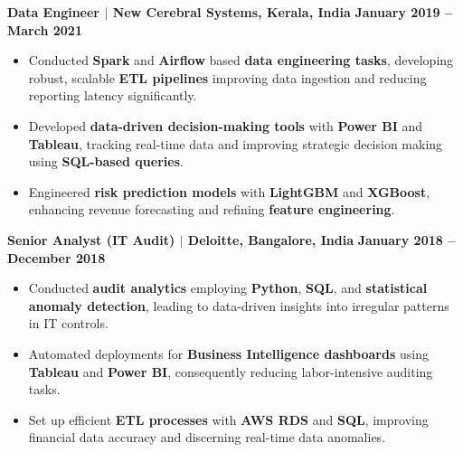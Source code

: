 \documentclass{article}
\begin{document}
\vspace{1mm}
\noindent \textbf{Data Engineer $\mid$ New Cerebral Systems, Kerala, India} \hfill \textbf{January 2019 -- March 2021}
\begin{itemize}[noitemsep, nolistsep, leftmargin=*]
    \item Conducted \textbf{Spark} and \textbf{Airflow} based \textbf{data engineering tasks}, developing robust, scalable \textbf{ETL pipelines} improving data ingestion and reducing reporting latency significantly.
    \item Developed \textbf{data-driven decision-making tools} with \textbf{Power BI} and \textbf{Tableau}, tracking real-time data and improving strategic decision making using \textbf{SQL-based queries}.
    \item Engineered \textbf{risk prediction models} with \textbf{LightGBM} and \textbf{XGBoost}, enhancing revenue forecasting and refining \textbf{feature engineering}.
\end{itemize}

\vspace{1mm}
\noindent \textbf{Senior Analyst (IT Audit) $\mid$ Deloitte, Bangalore, India} \hfill \textbf{January 2018 -- December 2018}
\begin{itemize}[noitemsep, nolistsep, leftmargin=*]
    \item Conducted \textbf{audit analytics} employing \textbf{Python}, \textbf{SQL}, and \textbf{statistical anomaly detection}, leading to data-driven insights into irregular patterns in IT controls.
    \item Automated deployments for \textbf{Business Intelligence dashboards} using \textbf{Tableau} and \textbf{Power BI}, consequently reducing labor-intensive auditing tasks.
    \item Set up efficient \textbf{ETL processes} with \textbf{AWS RDS} and \textbf{SQL}, improving financial data accuracy and discerning real-time data anomalies.
\end{itemize}
\end{document}
